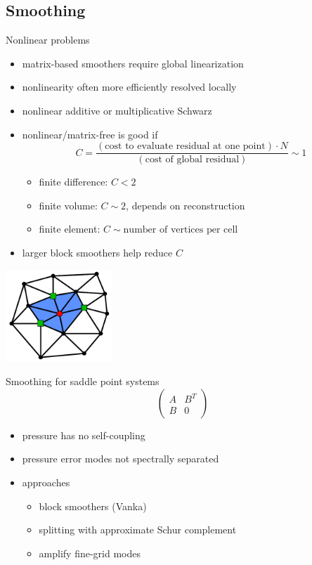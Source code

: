 \documentclass{beamer}
\begin{document}
\subsection{Smoothing}
\begin{frame}{Nonlinear problems}
  \begin{itemize}
  \item matrix-based smoothers require global linearization
  \item nonlinearity often more efficiently resolved locally
  \item nonlinear additive or multiplicative Schwarz
  \item nonlinear/matrix-free is good if
    \[ C = \frac{(\text{cost to evaluate residual at one point}) \cdot N}{(\text{cost of global residual})} \sim 1 \]
    \begin{itemize}
    \item finite difference: $C < 2$
    \item finite volume: $C \sim 2$, depends on reconstruction
    \item finite element: $C \sim \text{number of vertices per cell}$
    \end{itemize}
  \item larger block smoothers help reduce $C$
  \end{itemize}
  \vspace{-2.5em}
  \hfill \includegraphics[width=0.3\textwidth]{figures/NodeStencil}
\end{frame}

\begin{frame}{Smoothing for saddle point systems}
  \[ \begin{pmatrix}
    A & B^T \\ B & 0
  \end{pmatrix} \]
  \begin{itemize}
  \item pressure has no self-coupling
  \item pressure error modes not spectrally separated
  \item approaches
    \begin{itemize}
    \item block smoothers (Vanka)
    \item splitting with approximate Schur complement
    \item amplify fine-grid modes
    \end{itemize}
  \end{itemize}
\end{frame}
\end{document}
